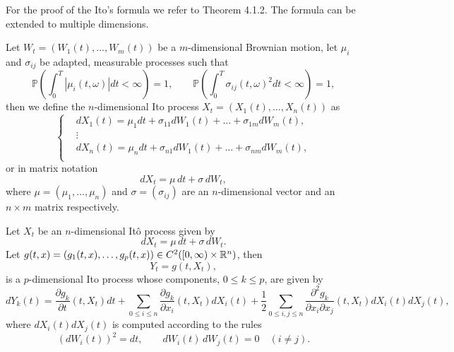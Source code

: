 For the proof of the Ito's formula we refer to \cite{oksendal_sde} Theorem 4.1.2.
The formula can be extended to multiple dimensions.

\begin{definition}
    Let $W_t = (W_1(t), \dots, W_m(t))$ be a $m$-dimensional Brownian motion,
    let $\mu_{i}$ and $\sigma_{ij}$ be adapted, measurable processes such that
    \begin{equation*}
        \mathbb{P} \left( \int^{T}_{0} \left| \mu_{i}(t, \omega) \right| dt < \infty \right) = 1,
        \qquad
        \mathbb{P} \left( \int^{T}_{0} \sigma_{ij}(t, \omega)^2 dt < \infty \right) = 1,
    \end{equation*}
    then we define the $n$-dimensional Ito process $X_t = (X_1(t), \dots, X_n(t))$ as
    \begin{equation*}
        \left\{
        \begin{aligned}
            & dX_1(t) = \mu_1 dt + \sigma_{11} dW_1(t) + \dots + \sigma_{1m} dW_m(t), \\
            & \vdots \\
            & dX_n(t) = \mu_n dt + \sigma_{n1} dW_1(t) + \dots + \sigma_{nm} dW_m(t), \\
        \end{aligned}
        \right.
    \end{equation*}
    or in matrix notation
    \begin{equation*}
        dX_t = \mu\, dt + \sigma\, dW_t,
    \end{equation*}
    where $\mu = (\mu_1, \dots, \mu_n)$ and $\sigma = (\sigma_{ij})$ are an $n$-dimensional vector and an $n \times m$ matrix respectively.
\end{definition}

\begin{theorem}\label{thm:ndim_ito_formula}
    Let $X_t$ be an $n$-dimensional Itô process given by
    \begin{equation*}
        dX_t = \mu\, dt + \sigma\, dW_t.
    \end{equation*}
    Let $g(t, x) = (g_1(t, x), \dots, g_p(t, x)) \in C^2([0, \infty) \times \mathbb{R}^n)$, then
    \begin{equation*}
        Y_t = g(t, X_t),
    \end{equation*}
    is a $p$-dimensional Ito process whose components, $0 \leq k \leq p$, are given by
    \begin{equation}\label{eq:ndim_ito_formula}
        dY_k(t) = 
            \frac{\partial g_k}{\partial t}(t, X_t) dt
            + \sum_{0 \leq i \leq n} \frac{\partial g_k}{\partial x_i}(t, X_t) dX_i(t)
            + \frac{1}{2} \sum_{0 \leq i,j \leq n} \frac{\partial^2 g_k}{\partial x_i \partial x_j}(t, X_t) dX_i(t) dX_j(t),
    \end{equation}
    where $dX_i(t) dX_j(t)$ is computed according to the rules
    \begin{equation*}
        (dW_i(t))^2 = dt, \qquad
        dW_i(t)\, dW_j(t) = 0 \quad (i \neq j).
    \end{equation*}
\end{theorem}

